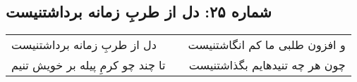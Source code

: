 \begin{center}
\section*{شماره ۲۵: دل از طربِ زمانه برداشتنیست}
\label{sec:025}
\begin{longtable}{l p{0.5cm} r}
دل از طربِ زمانه برداشتنیست
&&
و افزون طلبی ما کم انگاشتنیست
\\
تا چند چو کرمِ پیله بر خویش تنیم
&&
چون هر چه تنیدهایم بگذاشتنیست
\\
\end{longtable}
\end{center}
